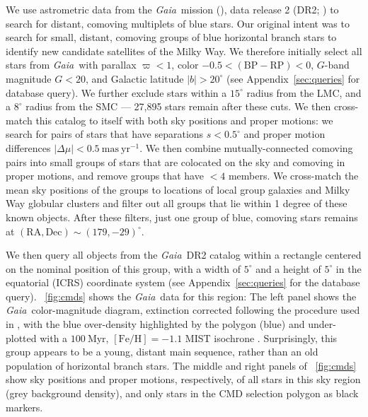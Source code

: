 \documentclass[twocolumn]{aastex62}
\newcommand{\acronym}[1]{{\small{#1}}}
\newcommand{\gaia}{\textsl{Gaia}}
\newcommand{\DR}[1]{\acronym{DR#1}}
\newcommand{\masyr}{\ensuremath{\textrm{mas}~\textrm{yr}^{-1}}}
\newcommand{\feh}{\ensuremath{[\textrm{Fe} / \textrm{H}]}}
\newcommand{\bprp}{\ensuremath{\textrm{BP} - \textrm{RP}}}
\begin{document}
We use astrometric data from the \gaia\ mission (\citealt{Prusti:2016}), data release 2 (\DR{2}; \citealt{Gaia-Collaboration:2018, Lindegren:2018}) to search for distant, comoving multiplets of blue stars.
Our original intent was to search for small, distant, comoving groups of blue horizontal branch stars to identify new candidate satellites of the Milky Way.
We therefore initially select all stars from \gaia\ with parallax $\varpi < 1$, color $-0.5 < (\bprp) < 0$, $G$-band magnitude $G < 20$, and Galactic latitude $|b| > 20^\circ$ (see Appendix~\ref{sec:queries} for database query).
We further exclude stars within a $15^\circ$ radius from the LMC, and a $8^\circ$ radius from the SMC --- 27,895 stars remain after these cuts.
We then cross-match this catalog to itself with both sky positions and proper motions: we search for pairs of stars that have separations $s < 0.5^\circ$ and proper motion differences $|\Delta \mu| < 0.5~\masyr$.
We then combine mutually-connected comoving pairs into small groups of stars that are colocated on the sky and comoving in proper motions, and remove groups that have $<4$ members.
We cross-match the mean sky positions of the groups to locations of local group galaxies \citep{McConnachie:2012} and Milky Way globular clusters \citep[2010 edition;][]{Harris:1996} and filter out all groups that lie within 1 degree of these known objects.
After these filters, just one group of blue, comoving stars remains at $(\textrm{RA}, \textrm{Dec}) \sim (179, -29)^\circ$.

We then query all objects from the \gaia\ \DR{2} catalog within a rectangle centered on the nominal position of this group, with a width of $5^\circ$ and a height of $5^\circ$ in the equatorial (ICRS) coordinate system (see Appendix~\ref{sec:queries} for the database query).
\figurename~\ref{fig:cmds} shows the \gaia\ data for this region:
The left panel shows the \gaia\ color-magnitude diagram, extinction corrected following the procedure used in \citet{Danielski:2018}, with the blue over-density highlighted by the polygon (blue) and under-plotted with a $100~\textrm{Myr}$, $\feh = -1.1$ \acronym{MIST} isochrone \citep[red line;][]{Dotter:2016, Choi:2016, Paxton:2011, Paxton:2013, Paxton:2015}.
Surprisingly, this group appears to be a young, distant main sequence, rather than an old population of horizontal branch stars.
The middle and right panels of \figurename~\ref{fig:cmds} show sky positions and proper motions, respectively, of all stars in this sky region (grey background density), and only stars in the CMD selection polygon as black markers.
\end{document}

